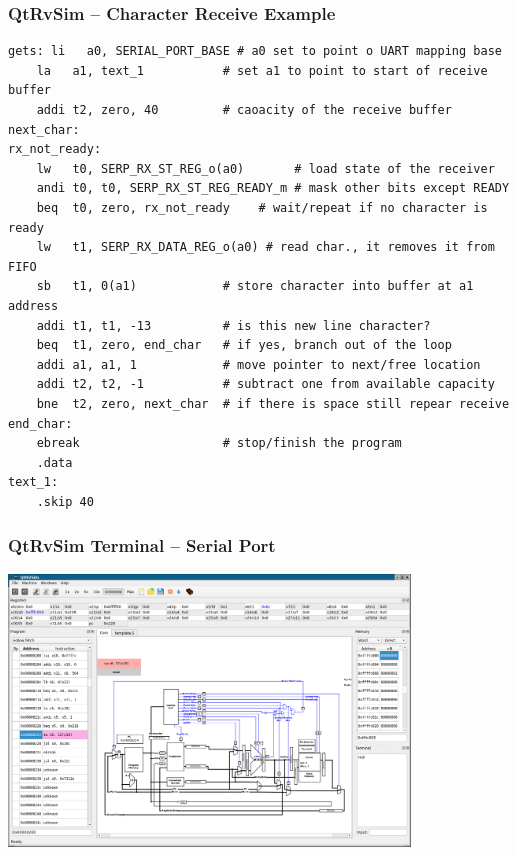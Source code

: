 \documentclass{beamer}
\begin{document}
\begin{frame}[fragile]
\frametitle{QtRvSim -- Character Receive Example}

\begin{verbatim}
gets: li   a0, SERIAL_PORT_BASE # a0 set to point o UART mapping base
    la   a1, text_1           # set a1 to point to start of receive buffer
    addi t2, zero, 40         # caoacity of the receive buffer
next_char:
rx_not_ready:
    lw   t0, SERP_RX_ST_REG_o(a0)       # load state of the receiver
    andi t0, t0, SERP_RX_ST_REG_READY_m # mask other bits except READY
    beq  t0, zero, rx_not_ready    # wait/repeat if no character is ready
    lw   t1, SERP_RX_DATA_REG_o(a0) # read char., it removes it from FIFO
    sb   t1, 0(a1)            # store character into buffer at a1 address
    addi t1, t1, -13          # is this new line character?
    beq  t1, zero, end_char   # if yes, branch out of the loop
    addi a1, a1, 1            # move pointer to next/free location
    addi t2, t2, -1           # subtract one from available capacity
    bne  t2, zero, next_char  # if there is space still repear receive
end_char:
    ebreak                    # stop/finish the program
    .data
text_1:
    .skip 40
\end{verbatim}
\end{frame}



\begin{frame}
\frametitle{QtRvSim Terminal -- Serial Port}
\begin{center}
\includegraphics[width=0.8\textwidth]{fig/QtRvSim-serial-normal.png}
\end{center}
\end{frame}
\end{document}
